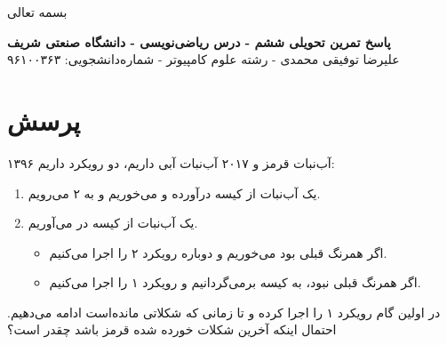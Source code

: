\documentclass[12pt,a4paper]{article}
\begin{document}
\begin{center}
	بسمه تعالی
\end{center}
\begin{center}
	\textbf{پاسخ تمرین تحویلی ششم - درس ریاضی‌نویسی - دانشگاه صنعتی شریف}
	\\
	علیرضا توفیقی محمدی - رشته علوم کامپیوتر - شماره‌دانشجویی: ۹۶۱۰۰۳۶۳
\end{center}
\section*{پرسش}
۱۳۹۶ آب‌نبات قرمز و ۲۰۱۷ آب‌نبات آبی داریم، دو رویکرد داریم:
\begin{enumerate}
	\item یک آب‌نبات از کیسه درآورده و می‌خوریم و به ۲ می‌رویم.
	\item
	یک آب‌نبات از کیسه در می‌آوریم.
	\begin{itemize}
		\item اگر همرنگ قبلی بود می‌خوریم و دوباره رویکرد ۲ را اجرا می‌کنیم.
		\item اگر همرنگ قبلی نبود، به کیسه برمی‌گردانیم و رویکرد ۱ را اجرا می‌کنیم.
	\end{itemize}
\end{enumerate}
در اولین گام رویکرد ۱ را اجرا کرده و تا زمانی که شکلاتی مانده‌است ادامه می‌دهیم. احتمال اینکه آخرین شکلات خورده شده قرمز باشد چقدر است؟
\end{document}
